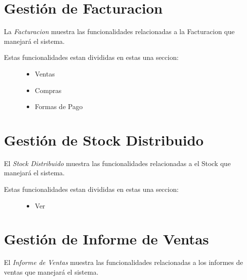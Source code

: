 \documentclass[a4paper,10pt,spanish]{sphinxmanual}
\begin{document}
\section{Gestión de Facturacion}
\label{pantallaprincipal:gestion-de-facturacion}\label{pantallaprincipal:gestion-facturacion}
La \emph{Facturacion} muestra las funcionalidades relacionadas a la Facturacion que manejará el sistema.

\begin{description}
\item[{Estas funcionalidades estan divididas en estas una seccion:}] \leavevmode\begin{itemize}
\item {} 
Ventas

\item {} 
Compras

\item {} 
Formas de Pago

\end{itemize}

\end{description}


\section{Gestión de Stock Distribuido}
\label{pantallaprincipal:gestion-de-stock-distribuido}\label{pantallaprincipal:gestion-stockdistribuido}
El \emph{Stock Distribuido} muestra las funcionalidades relacionadas a el Stock que manejará el sistema.

\begin{description}
\item[{Estas funcionalidades estan divididas en estas una seccion:}] \leavevmode\begin{itemize}
\item {} 
Ver

\end{itemize}

\end{description}


\section{Gestión de Informe de Ventas}
\label{pantallaprincipal:gestion-de-informe-de-ventas}\label{pantallaprincipal:gestion-informeventas}
El \emph{Informe de Ventas} muestra las funcionalidades relacionadas a los informes de ventas que manejará el sistema.
\end{document}
